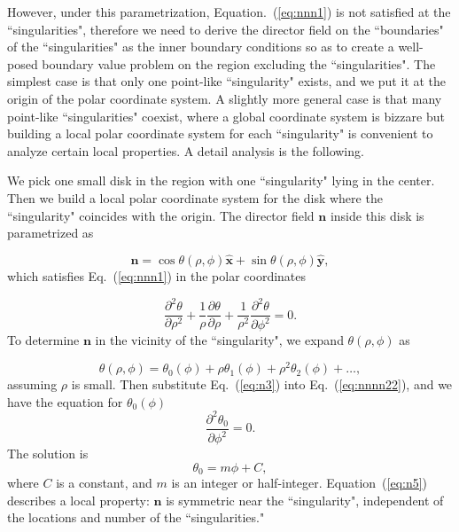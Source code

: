\documentclass[nottitlepage]{article}
\begin{document}
However, under this parametrization,  Equation.~(\ref{eq:nnn1}) is not satisfied at the ``singularities", therefore we need to derive the director field on the ``boundaries" of the ``singularities" as the inner boundary conditions so as to create a well-posed boundary value problem on the region excluding the ``singularities". The simplest case is that only one point-like ``singularity" exists, and we put it at the origin of the polar coordinate system. A slightly more general case is that many point-like ``singularities" coexist, where a global coordinate system is bizzare but building a local polar coordinate system for each ``singularity" is convenient to analyze certain local properties. A detail analysis is the following.

We pick one small disk in the region with one ``singularity" lying in the center. Then we build a local polar coordinate system for the disk where the ``singularity" coincides with the origin. The director field $\mathbf{n}$ inside this disk is parametrized as 

 \begin{equation}\label{eq:n1}
 \mathbf{n}=\cos\theta(\rho,\phi)\mathbf{\hat{x}}+\sin\theta(\rho,\phi)\mathbf{\hat{y}},
 \end{equation}
 which satisfies Eq.~(\ref{eq:nnn1}) in the polar coordinates
 
 \begin{equation}\label{eq:nnnn22}
  \frac{\partial^2\theta}{\partial\rho^2}+\frac{1}{\rho}\frac{\partial\theta}{\partial\rho}+\frac{1}{\rho^2}\frac{\partial^2\theta}{\partial\phi^2}=0.
  \end{equation}
To determine $\mathbf{n}$ in the vicinity of the ``singularity", we expand $\theta(\rho,\phi)$ as 

\begin{equation}\label{eq:n3}
\theta(\rho,\phi)=\theta_0(\phi)+\rho\theta_1(\phi)+\rho^2\theta_2(\phi)+\ldots,
  \end{equation}
assuming $\rho$ is small. Then substitute Eq.~(\ref{eq:n3}) into Eq.~(\ref{eq:nnnn22}), and we have the equation for $\theta_0(\phi)$
\begin{equation}\label{eq:n4}
\frac{\partial^2\theta_0}{\partial\phi^2}=0.
\end{equation}
The solution is
\begin{equation}\label{eq:n5}
 \theta_0=m\phi+C, 
 \end{equation}
where $C$ is a constant, and $m$ is an integer or half-integer. Equation~(\ref{eq:n5}) describes a local property: $\mathbf{n}$ is symmetric near the ``singularity", independent of the locations and number of the ``singularities."
\end{document}
